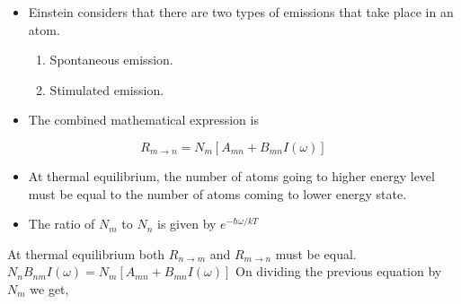 \documentclass[aspectratio=169]{beamer}
\begin{document}
\begin{frame}{}

	\begin{itemize}

		\item Einstein considers that there are two types of emissions that take place in an atom. \pause \newline
		\begin{enumerate}
			\item Spontaneous emission. \pause \newline
			\item Stimulated emission.
		\end{enumerate}			

		
	\end{itemize}
	
\end{frame}

\begin{frame}{}

	\begin{itemize}
	
		\item The combined mathematical expression is
		
	\end{itemize}
	
			\begin{equation}
					 R_{m \to n} = N_{m} [A_{mn} + B_{mn} I(\omega)] 
			\end{equation} 
	
\end{frame}

\begin{frame}{}

	\begin{itemize}

		\item At thermal equilibrium, the number of atoms going to higher energy level must be equal to the number of atoms coming to 					  lower energy state. \pause \newline	
		\item The ratio of $ N_{m} $ to $ N_{n} $ is given by $ e^{-\hbar \omega / kT} $  \newline
 
	\end{itemize}
	
\end{frame}

\begin{frame}{}

	\begin{center}

		 At thermal equilibrium both $ R_{n \to m} $ and $ R_{m \to n} $ must be equal. \pause \vspace{0.75cm}
		 $ N_{n} B_{nm} I(\omega) = N_{m} [A_{mn} + B_{mn} I(\omega)] $ \pause \newline
		 On dividing the previous equation by $ N_{m} $ we get, 
		
	\end{center}
	
\end{frame}
\end{document}
